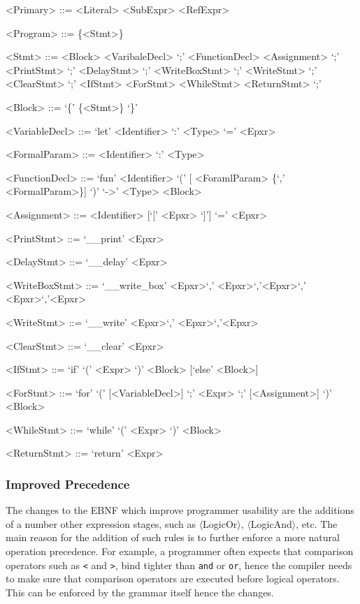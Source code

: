 \begin{center}
\begin{grammar}
<Primary> ::= <Literal>
\alt <SubExpr>
\alt <RefExpr>

<Program> ::= \{<Stmt>\}

<Stmt> ::= <Block>
\alt <VaribaleDecl> `;'
\alt <FunctionDecl>
\alt <Assignment> `;'
\alt <PrintStmt> `;'
\alt <DelayStmt> `;'
\alt <WriteBoxStmt> `;'
\alt <WriteStmt> `;'
\alt <ClearStmt> `;'
\alt <IfStmt>
\alt <ForStmt>
\alt <WhileStmt>
\alt <ReturnStmt> `;'

<Block> ::= `\{' \{<Stmt>\} `\}'

<VariableDecl> ::= `let' <Identifier> `:' <Type> `='
<Epxr>

<FormalParam> ::= <Identifier> `:' <Type>

<FunctionDecl> ::= `fun' <Identifier> `(' [ <ForamlParam>
\{`,' <FormalParam>\}] `)' `->' <Type> <Block>

<Assignment> ::= <Identifier> [`[' <Epxr> `]'] `='
<Epxr>

<PrintStmt> ::= `\_\_print' <Epxr>

<DelayStmt> ::= `\_\_delay' <Epxr>

<WriteBoxStmt> ::= `\_\_write\_box' <Epxr>`,'
<Epxr>`,'<Epxr>`,' <Epxr>`,'<Epxr>

<WriteStmt> ::= `\_\_write' <Epxr>`,' <Epxr>`,'<Epxr>

<ClearStmt> ::= `\_\_clear' <Epxr>

<IfStmt> ::= `if' `(' <Expr> `)' <Block> [`else' <Block>]

<ForStmt> ::= `for' `(' [<VariableDecl>] `;' <Expr> `;'
[<Assignment>] `)' <Block>

<WhileStmt> ::= `while' `(' <Expr> `)' <Block>

<ReturnStmt> ::= `return' <Expr>
\end{grammar}
\end{center}

\subsubsection{Improved Precedence}\label{sss:improvedprec}

The changes to the EBNF which improve programmer usability are
the additions of a number other expression stages, such as
$\langle$LogicOr$\rangle$, $\langle$LogicAnd$\rangle$, etc. The
main reason for the addition of such rules is to further enforce
a more natural operation precedence. For example, a programmer
often expects that comparison operators such as \texttt{<} and
\texttt{>}, bind tighter than \texttt{and} or \texttt{or}, hence
the compiler needs to make sure that comparison operators are
executed before logical operators. This can be enforced by the
grammar itself hence the changes.

